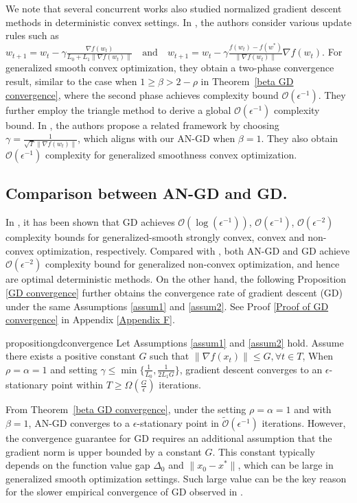 \documentclass[10pt]{article} %
\begin{document}
We note that several concurrent works also studied normalized gradient descent methods in deterministic convex settings. In \citet{petergensmooth}, the authors consider various update rules such as
$
w_{t+1} = w_t - \gamma \tfrac{\nabla f(w_t)}{L_0 + L_1 \|\nabla f(w_t)\|} \quad \text{and} \quad w_{t+1} = w_t - \gamma \tfrac{f(w_t) - f(w^*)}{\|\nabla f(w_t)\|} \nabla f(w_t).$
For generalized smooth convex optimization, they obtain a two-phase convergence result, similar to the case when $1 \geq \beta > 2 - \rho$ in Theorem~\ref{beta GD convergence}, where the second phase achieves complexity bound $\mathcal{O}(\epsilon^{-1})$. They further employ the triangle method to derive a global $\mathcal{O}(\epsilon^{-1})$ complexity bound. In \citet{L0L1newstudy}, the authors propose a related framework by choosing $\gamma = \frac{1}{\sqrt{T}\|\nabla f(w_t) \|}$, which aligns with our AN-GD when $\beta = 1$. They also obtain $\mathcal{O}(\epsilon^{-1})$ complexity for generalized smoothness convex optimization.


\subsection{Comparison between AN-GD and GD.}
In \citet{li2023convexnonconvexoptimizationgeneralized}, it has been shown that GD achieves $\mathcal{O}(\log({\epsilon}^{-1}))$, $\mathcal{O}({\epsilon}^{-1})$, $\mathcal{O}({\epsilon^{-2}})$ complexity bounds for generalized-smooth strongly convex, convex and non-convex optimization, respectively. 
Compared with \citet{pmlr-v202-chen23ar}, both AN-GD and GD achieve $\mathcal{O}({\epsilon^{-2}})$ complexity bound for generalized non-convex optimization,
and hence are optimal deterministic methods. On the other hand, the following Proposition \ref{GD convergence} further obtains the convergence rate of gradient descent (GD) under the same Assumptions \ref{assum1} and \ref{assum2}. See Proof \ref{Proof of GD convergence} in Appendix \ref{Appendix F}.
\begin{restatable}[Convergence of GD]{proposition}{gdconvergence}\label{GD convergence}
Let Assumptions \ref{assum1} and \ref{assum2} hold. Assume there exists a positive constant $G$ such that $\|\nabla f(x_t) \|\leq G, \forall t\in T$, 
    When $\rho=\alpha=1$ and setting $\gamma \leq \min \{\frac{1}{L_0}, \frac{1}{2L_1G} \}$, gradient descent converges to an $\epsilon$-stationary point within $T\geq\Omega(\frac{G}{\epsilon})$ iterations.
\end{restatable}
 From Theorem~\ref{beta GD convergence}, under the setting $\rho = \alpha = 1$ and with $\beta = 1$, AN-GD converges to a $\epsilon$-stationary point in $\tilde{\mathcal{O}}({\epsilon}^{-1})$ iterations.  However, the convergence guarantee for GD requires an additional assumption that the gradient norm is upper bounded by a constant $G$. This constant typically depends on the function value gap $\Delta_0$ and $\|x_0 - x^*\|$, which can be large in generalized smooth optimization settings. Such large value can be the key reason for the slower empirical convergence of GD observed in \citet{pmlr-v202-chen23ar}.
\end{document}
